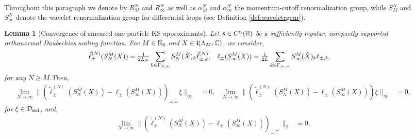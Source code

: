 \documentclass[a4paper, 11pt]{article}
\newcommand{\fl}{\mathfrak{l}}\newcommand{\cl}{\mathcal{l}}
\DeclareMathOperator{\1}{\mathds{1}}
\DeclareMathOperator{\std}{std}
\newtheorem{lemma}[thm]{Lemma}
\begin{document}
Throughout this paragraph we denote by $R^{N}_{M}$ and $R^{N}_{\infty}$ as well as $\alpha^{N}_{M}$ and $\alpha^{N}_{\infty}$ the momentum-cutoff renormalization group, while $S^{N}_{M}$ and $S^{N}_{\infty}$ denote the wavelet renormalization group for differential loops (see Definition \ref{def:waveletrgcur}).
\begin{lemma}[Convergence of smeared one-particle KS approximants]
\label{lem:KSconvsmeared}
Let $s\in C^{\alpha}(\mathbb{R})$ be a sufficiently regular, compactly supported orthonormal Daubechies scaling function.  For $M\in\mathbb{N}_{0}$ and $X\in\fl(\Lambda_{M},\C)$, we consider,
\begin{align*}
\tilde{\ell}^{(N)}_{\pm}(S^{M}_{N}(X)) & = \tfrac{1}{2L_{N}}\sum_{k\in\Gamma_{N,{\color{blue}+}}}S^{M}_{N}(\hat{X})_{k}\tilde{\ell}^{(N)}_{\pm,k}, & \ell_{\pm}(S^{M}_{\infty}(X)) & = \tfrac{1}{2L}\sum_{k\in\Gamma_{\infty,{\color{blue}+}}}S^{M}_{\infty}(\hat{X})_{k}\ell_{\pm,k},
\end{align*}
for any $N\geq M$.Then,
\begin{align*}
\lim_{N\rightarrow\infty}\|(\tilde{\ell}^{(N)}_{\pm}(S^{M}_{N}(X)\!)\!-\!\ell_{\pm}(S^{M}_{\infty}(X)\!)\!)_{\pm\pm}\xi\|_{\infty} & = 0, & \lim_{N\rightarrow\infty}\|(\tilde{\ell}^{(N)}_{\pm}(S^{M}_{N}(X)\!)\!-\!\ell_{\pm}(S^{M}_{\infty}(X)\!)\!)\xi\|_{\infty} & = 0,
\end{align*}
for $\xi\in\cD_{\std}$, and,
\begin{align*}
\lim_{N\rightarrow\infty}\|(\tilde{\ell}^{(N)}_{\pm}(S^{M}_{N}(X)\!)\!-\!\ell_{\pm}(S^{M}_{\infty}(X)\!)\!)_{\pm\mp}\|_{2} & = 0.
\end{align*}
\end{lemma}
\end{document}
